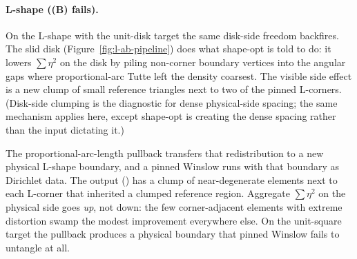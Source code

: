 \documentclass[11pt]{article}
\begin{document}
\paragraph{L-shape ((B) fails).}
On the L-shape with the unit-disk target the same disk-side
freedom backfires. The slid disk
(Figure~\ref{fig:l-ab-pipeline})
does what shape-opt is told to do: it lowers $\sum \eta^2$ on
the disk by piling non-corner boundary vertices into the
angular gaps where proportional-arc Tutte left the density
coarsest. The visible side effect is a new clump of small
reference triangles next to two of the pinned L-corners.
(Disk-side clumping is the diagnostic for dense physical-side
spacing; the same mechanism applies here, except shape-opt is
creating the dense spacing rather than the input dictating it.)

The proportional-arc-length pullback transfers that
redistribution to a new physical L-shape boundary, and a pinned
Winslow runs with that boundary as Dirichlet data. The output
() has a clump of near-degenerate
elements next to each L-corner that inherited a clumped
reference region. Aggregate $\sum \eta^2$ on the physical side
goes \emph{up}, not down: the few corner-adjacent elements with
extreme distortion swamp the modest improvement everywhere
else. On the unit-square target the pullback produces a
physical boundary that pinned Winslow fails to untangle at all.
\end{document}
